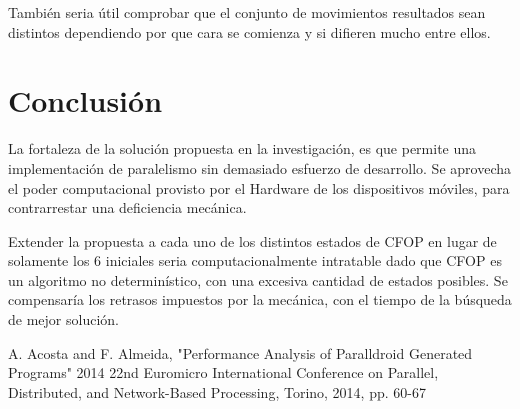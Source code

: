 \documentclass[runningheads,a4paper]{llncs}
\begin{document}
También seria útil comprobar que el conjunto de movimientos resultados sean distintos dependiendo por que cara se comienza y si difieren mucho entre ellos.

\section{Conclusión}

La fortaleza de la solución propuesta en la investigación, es que permite una implementación de paralelismo sin demasiado esfuerzo de desarrollo. Se aprovecha el poder computacional provisto por el Hardware de los dispositivos móviles, para contrarrestar una deficiencia mecánica. 

Extender la propuesta a cada uno de los distintos estados de CFOP en lugar de solamente los 6 iniciales seria computacionalmente intratable dado que CFOP es un algoritmo no determinístico, con una excesiva cantidad de estados posibles. Se compensaría los retrasos impuestos por la mecánica, con el tiempo de la búsqueda de mejor solución. 


\begin{thebibliography}{4}
 A. Acosta and F. Almeida, "Performance Analysis of Paralldroid Generated Programs" 2014 22nd Euromicro International Conference on Parallel, Distributed, and Network-Based Processing, Torino, 2014, pp. 60-67
\end{thebibliography}
\end{document}
